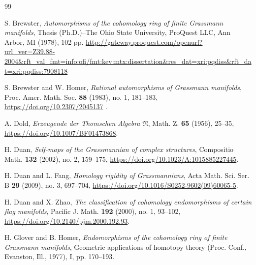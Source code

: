 \documentclass{amsart}
\begin{document}
\begin{thebibliography}{99}

 S. Brewster, \textit{Automorphisms of the cohomology ring of finite Grassmann manifolds}, %
Thesis (Ph.D.)--The Ohio State University, ProQuest LLC, Ann Arbor, MI (1978), 102 pp. \url{http://gateway.proquest.com/openurl?url_ver=Z39.88-2004&rft_val_fmt=info:ofi/fmt:kev:mtx:dissertation&res_dat=xri:pqdiss&rft_dat=xri:pqdiss:7908118}
	
 S. %
Brewster and W. Homer, \textit{Rational automorphisms of Grassmann manifolds}, Proc. Amer. Math. Soc. \textbf{88} (1983), no. %
1, 181--183, \url{https://doi.org/10.2307/2045137}%
.
	
 A. Dold, \textit{Erzeugende der Thomschen Algebra }$\mathfrak{N}$, Math. Z. \textbf{65} (1956), 25--35, \url{https://doi.org/10.1007/BF01473868}.

 H. Duan, \textit{Self-maps of the Grassmannian of complex structures}, Compositio Math. \textbf{132} (2002), no. 2, 159--175, \url{https://doi.org/10.1023/A:1015885227445}.
	
 H. Duan and L. Fang, \textit{Homology rigidity of Grassmannians}, Acta Math. Sci. Ser. B \textbf{29} (2009), no. 3, 697--704, \url{https://doi.org/10.1016/S0252-9602(09)60065-5}.

 H. Duan and X. Zhao, \textit{The classification of cohomology endomorphisms of certain flag manifolds}, Pacific J. Math. \textbf{192} (2000), no. 1, 93--102, \url{https://doi.org/10.2140/pjm.2000.192.93}.
	
 H. Glover and B. Homer, \textit{Endomorphisms of the cohomology ring of finite Grassmann manifolds}, Geometric applications of homotopy theory (Proc. Conf., Evanston, Ill., 1977), I, pp. 170--193.
	

\end{thebibliography}
\end{document}
